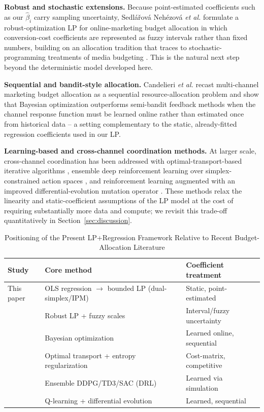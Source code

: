 \documentclass[conference]{IEEEtran}
\begin{document}
\textbf{Robust and stochastic extensions.} Because point-estimated coefficients such as our $\hat\beta_i$ carry sampling uncertainty, Sedl\'a\v{r}ov\'a Neh\'ezov\'a \emph{et al.} \cite{robust_lp_2025} formulate a robust-optimization LP for online-marketing budget allocation in which conversion-cost coefficients are represented as fuzzy intervals rather than fixed numbers, building on an allocation tradition that traces to stochastic-programming treatments of media budgeting \cite{robust_lp_2025}. This is the natural next step beyond the deterministic model developed here.

\textbf{Sequential and bandit-style allocation.} Candelieri \emph{et al.} \cite{bora_2022} recast multi-channel marketing budget allocation as a sequential resource-allocation problem and show that Bayesian optimization outperforms semi-bandit feedback methods when the channel response function must be learned online rather than estimated once from historical data -- a setting complementary to the static, already-fitted regression coefficients used in our LP.

\textbf{Learning-based and cross-channel coordination methods.} At larger scale, cross-channel coordination has been addressed with optimal-transport-based iterative algorithms \cite{adcob_2023}, ensemble deep reinforcement learning over simplex-constrained action spaces \cite{danaei_2026}, and reinforcement learning augmented with an improved differential-evolution mutation operator \cite{li_ieee_access_2024}. These methods relax the linearity and static-coefficient assumptions of the LP model at the cost of requiring substantially more data and compute; we revisit this trade-off quantitatively in Section~\ref{sec:discussion}.

\begin{table}[t]
\caption{Positioning of the Present LP+Regression Framework Relative to Recent Budget-Allocation Literature}
\label{tab:related}
\centering
\renewcommand{\arraystretch}{1.2}
\begin{tabular}{p{1.7cm}p{2.6cm}p{3.3cm}}
\toprule
\textbf{Study} & \textbf{Core method} & \textbf{Coefficient treatment} \\
\midrule
This paper & OLS regression $\rightarrow$ bounded LP (dual-simplex/IPM) & Static, point-estimated \\
\cite{robust_lp_2025} & Robust LP + fuzzy scales & Interval/fuzzy uncertainty \\
\cite{bora_2022} & Bayesian optimization & Learned online, sequential \\
\cite{adcob_2023} & Optimal transport + entropy regularization & Cost-matrix, competitive \\
\cite{danaei_2026} & Ensemble DDPG/TD3/SAC (DRL) & Learned via simulation \\
\cite{li_ieee_access_2024} & Q-learning + differential evolution & Learned, sequential \\
\bottomrule
\end{tabular}
\end{table}
\end{document}
